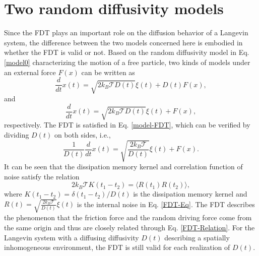 \documentclass[aps,pre,twocolumn,groupedaddress,longbibliography]{revtex4-2}
\begin{document}
\section{Two random diffusivity models}\label{Sec2}
Since the FDT plays an important role on the diffusion behavior of a Langevin system, the difference between the two models concerned here is embodied in whether the FDT is valid or not.
Based on the random diffusivity model in Eq. \eqref{model0} characterizing the motion of a free particle, two kinds of models under an external force $F(x)$ can be written as
\begin{equation}\label{model-FDT}
  \frac{d}{d t}x(t)=\sqrt{2k_B\mathcal{T}D(t)}\xi(t)+D(t)F(x),
\end{equation}
and
\begin{equation}\label{model-NFDT}
  \frac{d}{d t}x(t)=\sqrt{2k_B\mathcal{T}D(t)}\xi(t)+F(x),
\end{equation}
respectively. The FDT is satisfied in Eq. \eqref{model-FDT}, which can be verified by dividing $D(t)$ on both sides, i.e.,
\begin{equation}\label{FDT-Eq}
  \frac{1}{D(t)}\frac{d}{d t}x(t)=\sqrt{\frac{2k_B\mathcal{T}}{D(t)}}\xi(t)+F(x).
\end{equation}
It can be seen that the dissipation memory kernel and correlation function of noise satisfy the relation \cite{Kubo:1966,KuboTodaHashitsume:1985,Zwanzig:2001,WangChenDeng:2019}
\begin{equation}\label{FDT-Relation}
  2k_B\mathcal{T}K(t_1-t_2)=\langle R(t_1)R(t_2)\rangle,
\end{equation}
where $K(t_1-t_2)=\delta(t_1-t_2)/D(t)$ is the dissipation memory kernel and $R(t)=\sqrt{\frac{2k_B\mathcal{T}}{D(t)}}\xi(t)$ is the internal noise in Eq. \eqref{FDT-Eq}. The FDT describes the phenomenon that the friction force and the random driving force come from the same origin and thus are closely related through Eq. \eqref{FDT-Relation}. For the Langevin system with a diffusing diffusivity $D(t)$ describing a spatially inhomogeneous environment, the FDT is still valid for each realization of $D(t)$.
\end{document}
